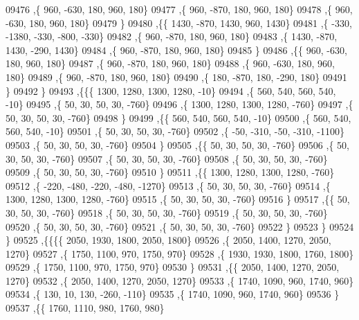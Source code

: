 \begin{DoxyCode}
09476     ,\{   960,  -630,   180,   960,   180\}
09477     ,\{   960,  -870,   180,   960,   180\}
09478     ,\{   960,  -630,   180,   960,   180\}
09479     \}
09480    ,\{\{  1430,  -870,  1430,   960,  1430\}
09481     ,\{  -330, -1380,  -330,  -800,  -330\}
09482     ,\{   960,  -870,   180,   960,   180\}
09483     ,\{  1430,  -870,  1430,  -290,  1430\}
09484     ,\{   960,  -870,   180,   960,   180\}
09485     \}
09486    ,\{\{   960,  -630,   180,   960,   180\}
09487     ,\{   960,  -870,   180,   960,   180\}
09488     ,\{   960,  -630,   180,   960,   180\}
09489     ,\{   960,  -870,   180,   960,   180\}
09490     ,\{   180,  -870,   180,  -290,   180\}
09491     \}
09492    \}
09493   ,\{\{\{  1300,  1280,  1300,  1280,   -10\}
09494     ,\{   560,   540,   560,   540,   -10\}
09495     ,\{    50,    30,    50,    30,  -760\}
09496     ,\{  1300,  1280,  1300,  1280,  -760\}
09497     ,\{    50,    30,    50,    30,  -760\}
09498     \}
09499    ,\{\{   560,   540,   560,   540,   -10\}
09500     ,\{   560,   540,   560,   540,   -10\}
09501     ,\{    50,    30,    50,    30,  -760\}
09502     ,\{   -50,  -310,   -50,  -310, -1100\}
09503     ,\{    50,    30,    50,    30,  -760\}
09504     \}
09505    ,\{\{    50,    30,    50,    30,  -760\}
09506     ,\{    50,    30,    50,    30,  -760\}
09507     ,\{    50,    30,    50,    30,  -760\}
09508     ,\{    50,    30,    50,    30,  -760\}
09509     ,\{    50,    30,    50,    30,  -760\}
09510     \}
09511    ,\{\{  1300,  1280,  1300,  1280,  -760\}
09512     ,\{  -220,  -480,  -220,  -480, -1270\}
09513     ,\{    50,    30,    50,    30,  -760\}
09514     ,\{  1300,  1280,  1300,  1280,  -760\}
09515     ,\{    50,    30,    50,    30,  -760\}
09516     \}
09517    ,\{\{    50,    30,    50,    30,  -760\}
09518     ,\{    50,    30,    50,    30,  -760\}
09519     ,\{    50,    30,    50,    30,  -760\}
09520     ,\{    50,    30,    50,    30,  -760\}
09521     ,\{    50,    30,    50,    30,  -760\}
09522     \}
09523    \}
09524   \}
09525  ,\{\{\{\{  2050,  1930,  1800,  2050,  1800\}
09526     ,\{  2050,  1400,  1270,  2050,  1270\}
09527     ,\{  1750,  1100,   970,  1750,   970\}
09528     ,\{  1930,  1930,  1800,  1760,  1800\}
09529     ,\{  1750,  1100,   970,  1750,   970\}
09530     \}
09531    ,\{\{  2050,  1400,  1270,  2050,  1270\}
09532     ,\{  2050,  1400,  1270,  2050,  1270\}
09533     ,\{  1740,  1090,   960,  1740,   960\}
09534     ,\{   130,    10,   130,  -260,  -110\}
09535     ,\{  1740,  1090,   960,  1740,   960\}
09536     \}
09537    ,\{\{  1760,  1110,   980,  1760,   980\}

\end{DoxyCode}
